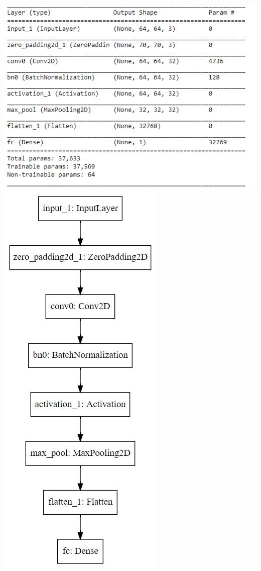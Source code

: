 \documentclass[11pt, a4paper]{article}
\begin{document}
\begin{spacing}{1.1}
	\begin{center}
	\includegraphics[scale=.7]{keras_sum} \hspace*{10mm} \includegraphics[scale=.5]{keras_graph}
	\end{center} \vspace*{2mm}

\end{spacing}
\end{document}
